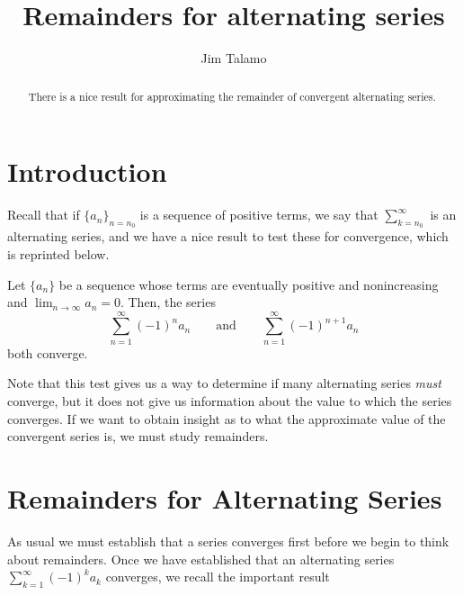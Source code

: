 \documentclass{ximera}
\title[Dig-In:]{Remainders for alternating series}
\author{Jim Talamo}
\begin{document}
\begin{abstract}
There is a nice result for approximating the remainder of convergent alternating series. 
\end{abstract}
\maketitle

\section{Introduction}
Recall that if $\{a_n\}_{n=n_0}$ is a sequence of positive terms, we say that $\sum_{k=n_0}^{\infty}$ is an alternating series, and we have a nice result to test these for convergence, which is reprinted below.

\begin{theorem}
Let $\{a_n\}$ be a sequence whose terms are eventually positive and nonincreasing and
$\lim_{n\to\infty}a_n=0$. Then, the series 
\[
\sum_{n=1}^\infty (-1)^{n}a_n \qquad \text{and}\qquad \sum_{n=1}^\infty (-1)^{n+1}a_n 
\]
both converge.
\end{theorem}


Note that this test gives us a way to determine if many alternating series \emph{must} converge, but it does not give us information about the value to which the series converges.  If we want to obtain insight as to what the approximate value of the convergent series is, we must study remainders.

  



\section{Remainders for Alternating Series}
As usual we must establish that a series converges first before we begin to think about remainders.  Once we have established that an alternating series $\sum_{k=1}^{\infty} (-1)^k a_k$ converges, we recall the important result

\begin{image}
  \end{image}
\end{document}
